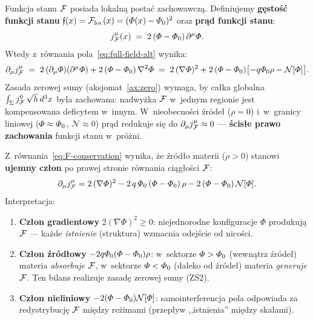 \begin{proposition}\label{prop:F-current}
Funkcja stanu $\mathcal{F}$ posiada lokaln\k{a} posta\'c zachowawcz\k{a}.
Definiujemy \textbf{g\k{e}sto\'s\'c funkcji stanu}
$\mathfrak{f}(x) = \mathcal{F}_{\mathrm{loc}}(x) = (\varPhi(x) - \varPhi_0)^2$ oraz
\textbf{pr\k{a}d funkcji stanu}:
\begin{equation}\label{eq:F-current}
    j_{\mathcal{F}}^\mu(x) \;=\; 2\,(\varPhi - \varPhi_0)\,\partial^\mu\varPhi.
\end{equation}
Wtedy z~r\'ownania pola~\eqref{eq:full-field-alt} wynika:
\begin{equation}\label{eq:F-conservation}
    \partial_\mu j_{\mathcal{F}}^\mu
    \;=\; 2\,(\partial_\mu\varPhi)(\partial^\mu\varPhi)
    + 2\,(\varPhi - \varPhi_0)\,\nabla^2\varPhi
    \;=\; 2\,(\nabla\varPhi)^2
    + 2\,(\varPhi - \varPhi_0)\bigl[-q\varPhi_0\rho
    - \mathcal{N}[\varPhi]\bigr].
\end{equation}
Zasada zerowej sumy (aksjomat~\ref{ax:zero}) wymaga, by
ca\l{}ka globalna $\int_\Sigma j_{\mathcal{F}}^0\,\sqrt{h}\,d^3x$
by\l{}a zachowana: nadwy\.zka $\mathcal{F}$ w~jednym regionie jest
kompensowana deficytem w~innym.
W~nieobecno\'sci \'zr\'ode\l{} ($\rho = 0$) i~w~granicy liniowej
($\varPhi \approx \varPhi_0$, $\mathcal{N} \approx 0$) pr\k{a}d
redukuje si\k{e} do $\partial_\mu j_{\mathcal{F}}^\mu \approx 0$
--- \textbf{\'scis\l{}e prawo zachowania} funkcji stanu
w~pr\'o\.zni.
\end{proposition}

\begin{corollary}%
\label{cor:F-source-balance}
Z~r\'ownania~\eqref{eq:F-conservation} wynika, \.ze \'zr\'od\l{}o
materii ($\rho > 0$) stanowi \textbf{ujemny cz\l{}on} po prawej
stronie r\'ownania ci\k{a}g\l{}o\'sci $\mathcal{F}$:
\begin{equation}\label{eq:F-source}
  \partial_\mu j_{\mathcal{F}}^\mu
  = 2\,(\nabla\varPhi)^2
  - 2\,q\,\varPhi_0\,(\varPhi - \varPhi_0)\,\rho
  - 2\,(\varPhi - \varPhi_0)\,\mathcal{N}[\varPhi].
\end{equation}
Interpretacja:
\begin{enumerate}[nosep]
  \item \textbf{Cz\l{}on gradientowy} $2(\nabla\Phi)^2 \geq 0$:
    niejednorodne konfiguracje $\Phi$ produkuj\k{a} $\mathcal{F}$ ---
    ka\.zde \emph{istnienie} (struktura) wzmacnia odej\'scie
    od nico\'sci.
  \item \textbf{Cz\l{}on \'zr\'od\l{}owy} $-2q\varPhi_0(\varPhi-\varPhi_0)\rho$:
    w~sektorze $\varPhi > \varPhi_0$ (wewn\k{a}trz \'zr\'ode\l{})
    materia \emph{absorbuje} $\mathcal{F}$, w~sektorze
    $\varPhi < \varPhi_0$ (daleko od \'zr\'ode\l{}) materia
    \emph{generuje} $\mathcal{F}$. Ten bilans realizuje
    zasad\k{e} zerowej sumy (ZS2).
  \item \textbf{Cz\l{}on nieliniowy} $-2(\varPhi-\varPhi_0)\mathcal{N}[\varPhi]$:
    samointerferencja pola odpowiada za redystrybucj\k{e} $\mathcal{F}$
    mi\k{e}dzy re\.zimami (przep\l{}yw ,,istnienia'' mi\k{e}dzy skalami).
\end{enumerate}
\end{corollary}

